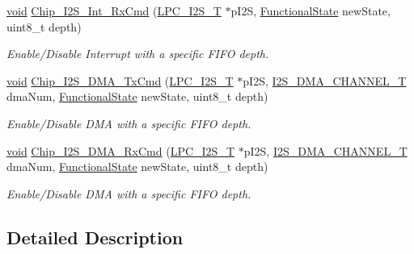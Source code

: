 \begin{DoxyCompactItemize}
\hyperlink{Paradigm_2Tern__EE_2small_2portmacro_8h_a14d32f8130d3c0b212cfc751730b5b49}{void} \hyperlink{group__I2S__17XX__40XX_ga36b0f5c62d5c703c1374bdcc0d84d07f}{Chip\-\_\-\-I2\-S\-\_\-\-Int\-\_\-\-Rx\-Cmd} (\hyperlink{structLPC__I2S__T}{L\-P\-C\-\_\-\-I2\-S\-\_\-\-T} $\ast$p\-I2\-S, \hyperlink{group__LPC__Types__Public__Types_gac9a7e9a35d2513ec15c3b537aaa4fba1}{Functional\-State} new\-State, uint8\-\_\-t depth)
\begin{DoxyCompactList}\small\item\em Enable/\-Disable Interrupt with a specific F\-I\-F\-O depth. \end{DoxyCompactList}\item 
\hyperlink{Paradigm_2Tern__EE_2small_2portmacro_8h_a14d32f8130d3c0b212cfc751730b5b49}{void} \hyperlink{group__I2S__17XX__40XX_gac08890ba38fd8e5df3a3a603e7a4fa42}{Chip\-\_\-\-I2\-S\-\_\-\-D\-M\-A\-\_\-\-Tx\-Cmd} (\hyperlink{structLPC__I2S__T}{L\-P\-C\-\_\-\-I2\-S\-\_\-\-T} $\ast$p\-I2\-S, \hyperlink{group__I2S__17XX__40XX_gac04c1583101ddd661886d9677683421b}{I2\-S\-\_\-\-D\-M\-A\-\_\-\-C\-H\-A\-N\-N\-E\-L\-\_\-\-T} dma\-Num, \hyperlink{group__LPC__Types__Public__Types_gac9a7e9a35d2513ec15c3b537aaa4fba1}{Functional\-State} new\-State, uint8\-\_\-t depth)
\begin{DoxyCompactList}\small\item\em Enable/\-Disable D\-M\-A with a specific F\-I\-F\-O depth. \end{DoxyCompactList}\item 
\hyperlink{Paradigm_2Tern__EE_2small_2portmacro_8h_a14d32f8130d3c0b212cfc751730b5b49}{void} \hyperlink{group__I2S__17XX__40XX_ga9c7067a9ee62d240aa6cd9426deefb13}{Chip\-\_\-\-I2\-S\-\_\-\-D\-M\-A\-\_\-\-Rx\-Cmd} (\hyperlink{structLPC__I2S__T}{L\-P\-C\-\_\-\-I2\-S\-\_\-\-T} $\ast$p\-I2\-S, \hyperlink{group__I2S__17XX__40XX_gac04c1583101ddd661886d9677683421b}{I2\-S\-\_\-\-D\-M\-A\-\_\-\-C\-H\-A\-N\-N\-E\-L\-\_\-\-T} dma\-Num, \hyperlink{group__LPC__Types__Public__Types_gac9a7e9a35d2513ec15c3b537aaa4fba1}{Functional\-State} new\-State, uint8\-\_\-t depth)
\begin{DoxyCompactList}\small\item\em Enable/\-Disable D\-M\-A with a specific F\-I\-F\-O depth. \end{DoxyCompactList}\end{DoxyCompactItemize}


\subsection{Detailed Description}


